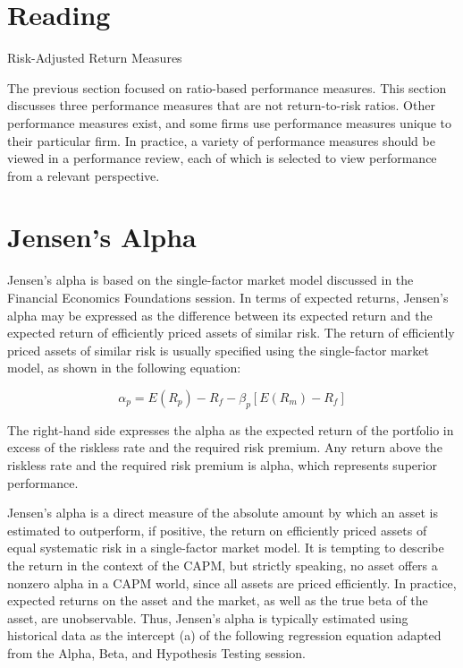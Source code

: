 \documentclass[11pt]{article}
\begin{document}
\section*{Reading}
Risk-Adjusted Return Measures

The previous section focused on ratio-based performance measures. This section discusses three performance measures that are not return-to-risk ratios. Other performance measures exist, and some firms use performance measures unique to their particular firm. In practice, a variety of performance measures should be viewed in a performance review, each of which is selected to view performance from a relevant perspective.

\section*{Jensen's Alpha}
Jensen's alpha is based on the single-factor market model discussed in the Financial Economics Foundations session. In terms of expected returns, Jensen's alpha may be expressed as the difference between its expected return and the expected return of efficiently priced assets of similar risk. The return of efficiently priced assets of similar risk is usually specified using the single-factor market model, as shown in the following equation:


\begin{equation*}
\alpha_{p}=E\left(R_{p}\right)-R_{f}-\beta_{p}\left[E\left(R_{m}\right)-R_{f}\right] \tag{1}
\end{equation*}


The right-hand side expresses the alpha as the expected return of the portfolio in excess of the riskless rate and the required risk premium. Any return above the riskless rate and the required risk premium is alpha, which represents superior performance.

Jensen's alpha is a direct measure of the absolute amount by which an asset is estimated to outperform, if positive, the return on efficiently priced assets of equal systematic risk in a single-factor market model. It is tempting to describe the return in the context of the CAPM, but strictly speaking, no asset offers a nonzero alpha in a CAPM world, since all assets are priced efficiently. In practice, expected returns on the asset and the market, as well as the true beta of the asset, are unobservable. Thus, Jensen's alpha is typically estimated using historical data as the intercept (a) of the following regression equation adapted from the Alpha, Beta, and Hypothesis Testing session.
\end{document}
